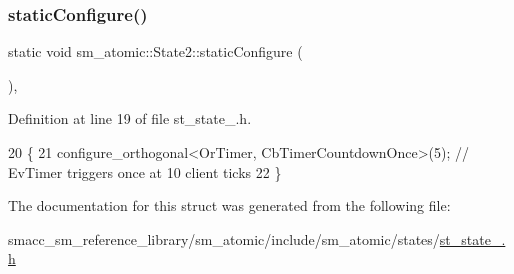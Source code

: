 \subsubsection{\texorpdfstring{static\+Configure()}{staticConfigure()}}
{\footnotesize\ttfamily static void sm\+\_\+atomic\+::\+State2\+::static\+Configure (\begin{DoxyParamCaption}{ }\end{DoxyParamCaption})\hspace{0.3cm}{\ttfamily [inline]}, {\ttfamily [static]}}



Definition at line 19 of file st\+\_\+state\+\_.\+h.


\begin{DoxyCode}
20     \{
21         configure\_orthogonal<OrTimer, CbTimerCountdownOnce>(5); \textcolor{comment}{// EvTimer triggers once at 10 client ticks}
22     \}
\end{DoxyCode}


The documentation for this struct was generated from the following file\+:\begin{DoxyCompactItemize}
\item 
smacc\+\_\+sm\+\_\+reference\+\_\+library/sm\+\_\+atomic/include/sm\+\_\+atomic/states/\hyperlink{sm__atomic_2include_2sm__atomic_2states_2st__state__2_8h}{st\+\_\+state\+\_.\+h}\end{DoxyCompactItemize}
